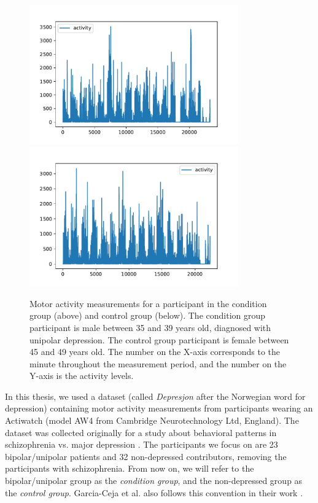 \begin{figure}[!ht]
  \centering
  \includegraphics[height=6cm]{img/activity_condition_1.pdf}
  \includegraphics[height=6cm]{img/activity_control_1.pdf}
  \caption{Motor activity measurements for a participant in the condition group (above) and control group (below). The condition group participant is male between 35 and 39 years old, diagnosed with unipolar depression. The control group participant is female between 45 and 49 years old. The number on the X-axis corresponds to the minute throughout the measurement period, and the number on the Y-axis is the activity levels.}
  \label{figure:participant_activity}
\end{figure}

In this thesis, we used a dataset (called \textit{Depresjon} after the Norwegian word for depression) containing motor activity measurements from participants wearing an Actiwatch (model AW4 from Cambridge Neurotechnology Ltd, England). The dataset was collected originally for a study about behavioral patterns in schizophrenia vs. major depression \cite{Berle2010}. The participants we focus on are 23 bipolar/unipolar patients and 32 non-depressed contributors, removing the participants with schizophrenia. From now on, we will refer to the bipolar/unipolar group as the \textit{condition group}, and the non-depressed group as the \textit{control group}. Garcia-Ceja et al. also follows this convention in their work \cite{GarciaCeja2018_classification_bipolar}.

